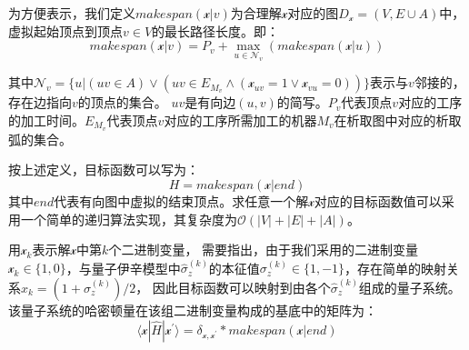为方便表示，我们定义$makespan(\mathcal{x}|v)$为合理解$\mathcal{x}$对应的图$D_{\mathcal{x}}=(V,E\cup A)$中，虚拟起始顶点到顶点$v\in V$的最长路径长度。即：
\begin{equation}
    makespan(\mathcal{x}|v) = P_{v} + \max_{u\in \mathscr{N}_{v}}(makespan(\mathcal{x}|u))
\end{equation}

其中$\mathscr{N}_{v}=\{u|(uv\in A)\vee(uv\in E_{M_{v}}\wedge(\mathcal{x}_{uv}=1\vee\mathcal{x}_{vu}=0))\}$表示与$v$邻接的，存在边指向$v$的顶点的集合。
$uv$是有向边$(u,v)$的简写。$P_v$代表顶点$v$对应的工序的加工时间。$E_{M_v}$代表顶点$v$对应的工序所需加工的机器$M_v$在析取图中对应的析取弧的集合。

按上述定义，目标函数可以写为：
\begin{equation} \label{eq:JSP_object_function}
    H=makespan(\mathcal{x}|end)
\end{equation}
其中$end$代表有向图中虚拟的结束顶点。求任意一个解$\mathcal{x}$对应的目标函数值可以采用一个简单的递归算法实现，其复杂度为$\mathcal{O}(|V|+|E|+|A|)$。

用$\mathcal{x}_{k}$表示解$\mathcal{x}$中第$k$个二进制变量，
需要指出，由于我们采用的二进制变量$\mathcal{x}_{k}\in\{1,0\}$，与量子伊辛模型中$\hat{\sigma}_z^{(k)}$的本征值$\sigma_z^{(k)} \in \{1,-1\}$，存在简单的映射关系$x_{k} = (1+\sigma_z^{(k)})/2$，
因此目标函数可以映射到由各个$\hat{\sigma}_z^{(k)}$组成的量子系统。该量子系统的哈密顿量在该组二进制变量构成的基底中的矩阵为：
\begin{equation} \label{eq:JSP_H_objection}
    \langle \mathcal{x}|\hat{H}|\mathcal{x}^{\prime}\rangle=\delta_{\mathcal{x},\mathcal{x}^{\prime}}*makespan(\mathcal{x}|end)
\end{equation}
